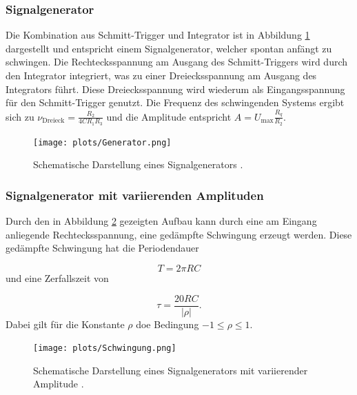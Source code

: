 \subsubsection{Signalgenerator}
\label{sec:Signalgenerator}

Die Kombination aus Schmitt-Trigger und Integrator ist in Abbildung \ref{fig:6} dargestellt und entspricht einem Signalgenerator, welcher spontan anfängt zu schwingen.
Die Rechtecksspannung am Ausgang des Schmitt-Triggers wird durch den Integrator integriert, was zu einer Dreiecksspannung am Ausgang des Integrators führt.
Diese Dreiecksspannung wird wiederum als Eingangsspannung für den Schmitt-Trigger genutzt.
Die Frequenz des schwingenden Systems ergibt sich zu $\nu_{\text{Dreieck}} = \frac{R_2}{4 C R_1 R_3}$ und die Amplitude entspricht $A = U_{\text{max}} \frac{R_q}{R_2}$.

\begin{figure}
    \centering
        \texttt{[image: plots/Generator.png]}
    \caption{Schematische Darstellung eines Signalgenerators \cite{Anleitung}.}
    \label{fig:6}
\end{figure}


\subsubsection{Signalgenerator mit variierenden Amplituden}
\label{sec:Signalgenerator_2}

Durch den in Abbildung \ref{fig:7} gezeigten Aufbau kann durch eine am Eingang anliegende Rechtecksspannung, eine gedämpfte Schwingung erzeugt werden.
Diese gedämpfte Schwingung hat die Periodendauer 

\begin{equation}
    T = 2 \pi R C
\end{equation}
und eine Zerfallszeit von

\begin{equation}
    \tau = \frac{20 R C}{|\rho|}.
\end{equation}
Dabei gilt für die Konstante $\rho$ doe Bedingung $-1 \leq \rho \leq 1$.
\begin{figure}
    \centering
        \texttt{[image: plots/Schwingung.png]}
    \caption{Schematische Darstellung eines Signalgenerators mit variierender Amplitude \cite{Anleitung}.}
    \label{fig:7}
\end{figure}
